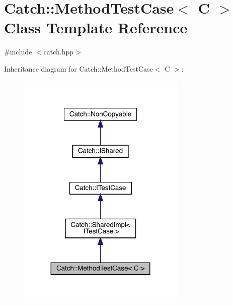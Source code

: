 \hypertarget{class_catch_1_1_method_test_case}{}\section{Catch\+:\+:Method\+Test\+Case$<$ C $>$ Class Template Reference}
\label{class_catch_1_1_method_test_case}


{\ttfamily \#include $<$catch.\+hpp$>$}



Inheritance diagram for Catch\+:\+:Method\+Test\+Case$<$ C $>$\+:
\nopagebreak
\begin{figure}[H]
\begin{center}
\leavevmode
\includegraphics[width=227pt]{class_catch_1_1_method_test_case__inherit__graph}
\end{center}
\end{figure}



